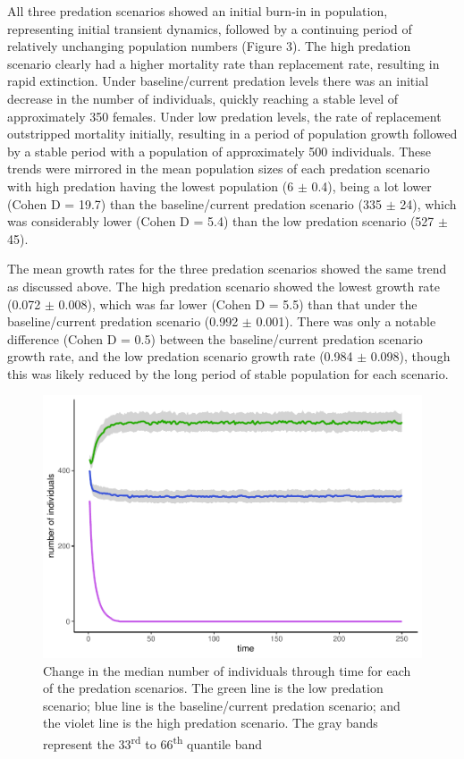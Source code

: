 \documentclass[11pt,]{article}
\begin{document}
All three predation scenarios showed an initial burn-in in population,
representing initial transient dynamics, followed by a continuing period
of relatively unchanging population numbers (Figure 3). The high
predation scenario clearly had a higher mortality rate than replacement
rate, resulting in rapid extinction. Under baseline/current predation
levels there was an initial decrease in the number of individuals,
quickly reaching a stable level of approximately 350 females. Under low
predation levels, the rate of replacement outstripped mortality
initially, resulting in a period of population growth followed by a
stable period with a population of approximately 500 individuals. These
trends were mirrored in the mean population sizes of each predation
scenario with high predation having the lowest population (6 \(\pm\)
0.4), being a lot lower (Cohen D = 19.7) than the baseline/current
predation scenario (335 \(\pm\) 24), which was considerably lower (Cohen
D = 5.4) than the low predation scenario (527 \(\pm\) 45).

The mean growth rates for the three predation scenarios showed the same
trend as discussed above. The high predation scenario showed the lowest
growth rate (0.072 \(\pm\) 0.008), which was far lower (Cohen D = 5.5)
than that under the baseline/current predation scenario (0.992 \(\pm\)
0.001). There was only a notable difference (Cohen D = 0.5) between the
baseline/current predation scenario growth rate, and the low predation
scenario growth rate (0.984 \(\pm\) 0.098), though this was likely
reduced by the long period of stable population for each scenario.

\begin{figure}
\centering
\includegraphics{kea_PVA_manuscript_files/figure-latex/Population timeseries figure-1.pdf}
\caption{Change in the median number of individuals through time for
each of the predation scenarios. The green line is the low predation
scenario; blue line is the baseline/current predation scenario; and the
violet line is the high predation scenario. The gray bands represent the
33\textsuperscript{rd} to 66\textsuperscript{th} quantile band}
\end{figure}
\end{document}
